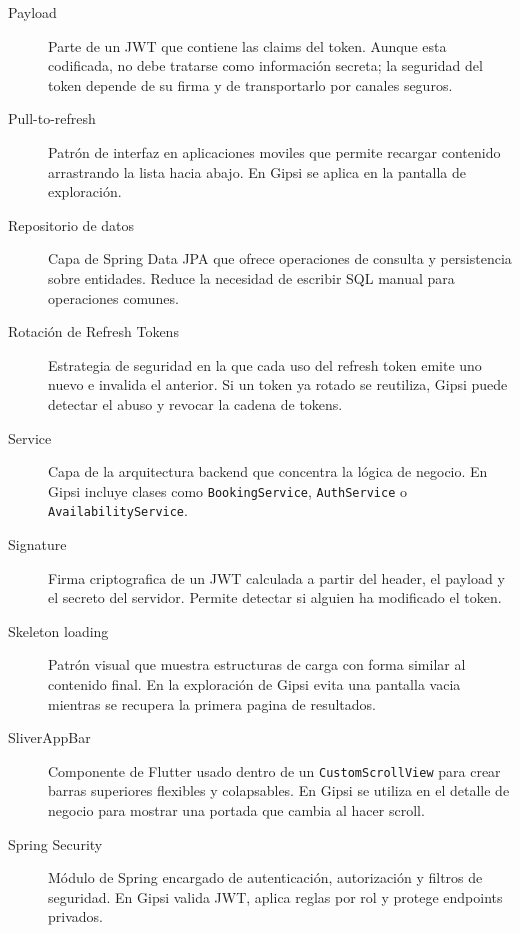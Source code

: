 \documentclass[12pt,a4paper,twoside]{report}
\begin{document}
\begin{description}
  \item[Payload]
  Parte de un JWT que contiene las claims del token. Aunque esta codificada, no debe
  tratarse como informaci\'on secreta; la seguridad del token depende de su firma y de
  transportarlo por canales seguros.

  \item[Pull-to-refresh]
  Patr\'on de interfaz en aplicaciones moviles que permite recargar contenido arrastrando
  la lista hacia abajo. En Gipsi se aplica en la pantalla de exploraci\'on.

  \item[Repositorio de datos]
  Capa de Spring Data JPA que ofrece operaciones de consulta y persistencia sobre
  entidades. Reduce la necesidad de escribir SQL manual para operaciones comunes.

  \item[Rotaci\'on de Refresh Tokens]
  Estrategia de seguridad en la que cada uso del refresh token emite uno nuevo e invalida
  el anterior. Si un token ya rotado se reutiliza, Gipsi puede detectar el abuso y revocar
  la cadena de tokens.

  \item[Service]
  Capa de la arquitectura backend que concentra la l\'ogica de negocio. En Gipsi incluye
  clases como \texttt{BookingService}, \texttt{AuthService} o \texttt{AvailabilityService}.

  \item[Signature]
  Firma criptografica de un JWT calculada a partir del header, el payload y el secreto
  del servidor. Permite detectar si alguien ha modificado el token.

  \item[Skeleton loading]
  Patr\'on visual que muestra estructuras de carga con forma similar al contenido final.
  En la exploraci\'on de Gipsi evita una pantalla vacia mientras se recupera la primera
  pagina de resultados.

  \item[SliverAppBar]
  Componente de Flutter usado dentro de un \texttt{CustomScrollView} para crear barras
  superiores flexibles y colapsables. En Gipsi se utiliza en el detalle de negocio para
  mostrar una portada que cambia al hacer scroll.

  \item[Spring Security]
  M\'odulo de Spring encargado de autenticaci\'on, autorizaci\'on y filtros de seguridad.
  En Gipsi valida JWT, aplica reglas por rol y protege endpoints privados.


\end{description}
\end{document}
